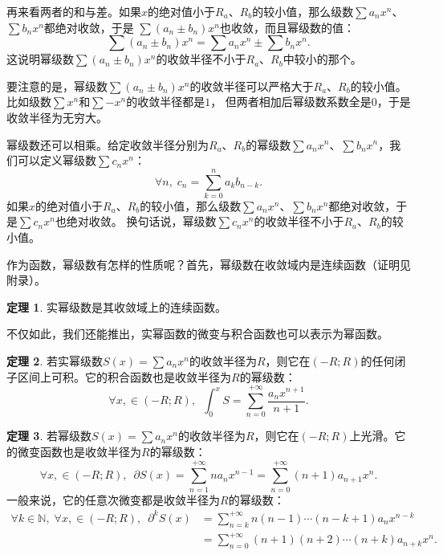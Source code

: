 \documentclass[12pt,UTF8]{ctexbook}
\theoremstyle{definition}
\newtheorem{tm}{定理}[section]
\theoremstyle{plain}
\begin{document}
再来看两者的和与差。如果$x$的绝对值小于$R_a$、$R_b$的较小值，那么级数$\sum a_n x^n$、$\sum b_n x^n$都绝对收敛，于是
$\sum (a_n \pm b_n) x^n$也收敛，而且幂级数的值：
$$\sum (a_n \pm b_n) x^n = \sum a_n x^n \pm \sum b_n x^n.$$
这说明幂级数$\sum (a_n \pm b_n) x^n$的收敛半径不小于$R_a$、$R_b$中较小的那个。

要注意的是，幂级数$\sum (a_n \pm b_n) x^n$的收敛半径可以严格大于$R_a$、$R_b$的较小值。比如级数$\sum x^n$和$\sum -x^n$的收敛半径都是$1$，
但两者相加后幂级数系数全是$0$，于是收敛半径为无穷大。

幂级数还可以相乘。给定收敛半径分别为$R_a$、$R_b$的幂级数$\sum a_n x^n$、$\sum b_n x^n$，我们可以定义幂级数$\sum c_n x^n$：
$$ \forall n, \; c_n = \sum_{k=0}^n a_k b_{n-k}.$$
如果$x$的绝对值小于$R_a$、$R_b$的较小值，那么级数$\sum a_n x^n$、$\sum b_n x^n$都绝对收敛，于是$\sum c_n x^n$也绝对收敛。
换句话说，幂级数$\sum c_n x^n$的收敛半径不小于$R_a$、$R_b$的较小值。

作为函数，幂级数有怎样的性质呢？首先，幂级数在收敛域内是连续函数（证明见附录）。

\begin{tm}
    实幂级数是其收敛域上的连续函数。
\end{tm}

不仅如此，我们还能推出，实幂函数的微变与积合函数也可以表示为幂函数。

\begin{tm}
    若实幂级数$S(x) = \sum a_n x^n$的收敛半径为$R$，则它在$(-R;R)$的任何闭子区间上可积。它的积合函数也是收敛半径为$R$的幂级数：
    $$ \forall x, \in (-R;R),\,\,\, \int_0^x S =  \sum_{n=0}^{+\infty} \frac{a_n x^{n+1}}{n + 1}. $$
\end{tm}

\begin{tm}
    若幂级数$S(x) = \sum a_n x^n$的收敛半径为$R$，则它在$(-R;R)$上光滑。它的微变函数也是收敛半径为$R$的幂级数：
    $$ \forall x, \in (-R;R),\,\,\, \partial S(x) =  \sum_{n=1}^{+\infty} na_n x^{n-1} = \sum_{n=0}^{+\infty} (n + 1)a_{n+1} x^{n}. $$
    一般来说，它的任意次微变都是收敛半径为$R$的幂级数：
    \begin{align*}
        \forall k \in \mathbb{N},\;\forall x, \in (-R;R),\,\,\, \partial^k S(x) &= \sum_{n=k}^{+\infty} n(n-1)\cdots(n - k + 1)a_n x^{n-k} \\
        &= \sum_{n=0}^{+\infty} (n + 1)(n + 2)\cdots(n + k)a_{n+k} x^{n}. \\
    \end{align*}
\end{tm}
\end{document}
